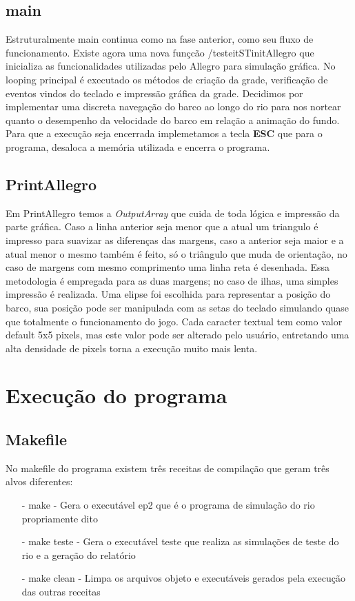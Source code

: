 \documentclass[a4paper,11pt]{article}
\begin{document}
\subsection{main}
Estruturalmente main continua como na fase anterior, como seu fluxo de funcionamento. Existe agora uma nova funçcão /testeit{STinitAllegro} que inicializa as funcionalidades utilizadas pelo Allegro para simulação gráfica. No looping principal é executado os métodos de criação da grade, verificação de eventos vindos do teclado e impressão gráfica da grade. Decidimos por implementar uma discreta navegação do barco ao longo do rio para nos nortear quanto o desempenho da velocidade do barco em relação a animação do fundo. Para que a execução seja encerrada implemetamos a tecla \textbf{ESC} que para o programa, desaloca a memória utilizada e encerra o programa.
\subsection{PrintAllegro}
Em PrintAllegro temos a \textit{OutputArray} que cuida de toda lógica e impressão da parte gráfica. Caso a linha anterior seja menor que a atual um triangulo é impresso para suavizar as diferenças das margens, caso a anterior seja maior e a atual menor o mesmo também é feito, só o triângulo que muda de orientação, no caso de margens com mesmo comprimento uma linha reta é desenhada. Essa metodologia é empregada para as duas margens; no caso de ilhas, uma simples impressão é realizada.
Uma elipse foi escolhida para representar a posição do barco, sua posição pode ser manipulada com as setas do teclado simulando quase que totalmente o funcionamento do jogo. Cada caracter textual tem como valor default 5x5 pixels, mas este valor pode ser alterado pelo usuário, entretando uma alta densidade de pixels torna a execução muito mais lenta.

\section{Execu\c{c}ão do programa}
\subsection{Makefile}
No makefile do programa existem três receitas de compila\c{c}ão que geram três alvos diferentes:
\begin{enumerate}
\item[-]{make - Gera o executável ep2 que é o programa de simula\c{c}ão do rio propriamente dito}
\item[-]{make teste - Gera o executável teste que realiza as simula\c{c}ões de teste do rio e a gera\c{c}ão do relatório}
\item[-]{make clean - Limpa os arquivos objeto e executáveis gerados pela execu\c{c}ão das outras receitas}
\end{enumerate}
\end{document}
